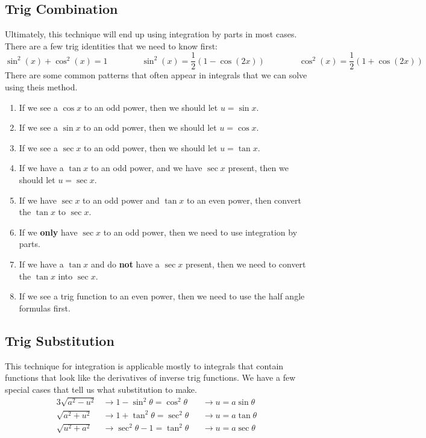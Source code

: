 \documentclass{article}
\begin{document}
\subsection{Trig Combination}
Ultimately, this technique will end up using integration by parts in most cases.
There are a few trig identities that we need to know first:
\[
\sin^{2}{(x)} + \cos^{2}{(x)} = 1\qquad\qquad
\sin^{2}{(x)} = \frac{1}{2}(1-\cos{(2x)})\qquad\qquad
\cos^{2}{(x)} = \frac{1}{2}(1+\cos{(2x)})
\]
There are some common patterns that often appear in integrals that we can solve using theis method.
\begin{enumerate}
\item If we see a $\cos{x}$ to an odd power, then we should let $u = \sin{x}$.
\item If we see a $\sin{x}$ to an odd power, then we should let $u = \cos{x}$.
\item If we see a $\sec{x}$ to an odd power, then we should let $u = \tan{x}$.
\item If we have a $\tan{x}$ to an odd power, and we have $\sec{x}$ present, then we should let $u=\sec{x}$.
\item If we have $\sec{x}$ to an odd power and $\tan{x}$ to an even power, then convert the $\tan{x}$ to $\sec{x}$.
\item If we \textbf{only} have $\sec{x}$ to an odd power, then we need to use integration by parts.
\item If we have a $\tan{x}$ and do \textbf{not} have a $\sec{x}$ present, then we need to convert the $\tan{x}$ into $\sec{x}$.
\item If we see a trig function to an even power, then we need to use the half angle formulas first.
\end{enumerate}

\subsection{Trig Substitution}
This technique for integration is applicable mostly to integrals that contain functions that look like the derivatives of inverse trig functions.
We have a few special cases that tell us what substitution to make.
\begin{alignat*}{3}
\sqrt{a^{2} - u^{2}} &\to 1 - \sin^{2}{\theta} = \cos^{2}{\theta} &&\to u = a\sin{\theta}\\
\sqrt{a^{2} + u^{2}} &\to 1 + \tan^{2}{\theta} = \sec^{2}{\theta} &&\to u = a\tan{\theta}\\
\sqrt{u^{2} + a^{2}} &\to \sec^{2}{\theta} - 1 = \tan^{2}{\theta} &&\to u = a\sec{\theta}\\
\end{alignat*}
\end{document}
